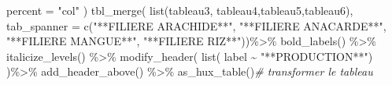 \documentclass[
  14pt,
]{article}
\newenvironment{Shaded}{\begin{snugshade}}{\end{snugshade}}
\newcommand{\AttributeTok}[1]{\textcolor[rgb]{0.77,0.63,0.00}{#1}}
\newcommand{\CommentTok}[1]{\textcolor[rgb]{0.56,0.35,0.01}{\textit{#1}}}
\newcommand{\FunctionTok}[1]{\textcolor[rgb]{0.00,0.00,0.00}{#1}}
\newcommand{\NormalTok}[1]{#1}
\newcommand{\SpecialCharTok}[1]{\textcolor[rgb]{0.00,0.00,0.00}{#1}}
\newcommand{\StringTok}[1]{\textcolor[rgb]{0.31,0.60,0.02}{#1}}
\begin{document}
\begin{Shaded}
\begin{Highlighting}[]
    \AttributeTok{percent =} \StringTok{"col"}
\NormalTok{  ) }
\FunctionTok{tbl\_merge}\NormalTok{(}
  \FunctionTok{list}\NormalTok{(tableau3, tableau4,tableau5,tableau6),}
  \AttributeTok{tab\_spanner =} \FunctionTok{c}\NormalTok{(}\StringTok{"**FILIERE ARACHIDE**"}\NormalTok{, }
                  \StringTok{"**FILIERE ANACARDE**"}\NormalTok{,}
                  \StringTok{"**FILIERE MANGUE**"}\NormalTok{,}
                  \StringTok{"**FILIERE RIZ**"}\NormalTok{))}\SpecialCharTok{\%\textgreater{}\%}
  \FunctionTok{bold\_labels}\NormalTok{() }\SpecialCharTok{\%\textgreater{}\%}
  \FunctionTok{italicize\_levels}\NormalTok{() }\SpecialCharTok{\%\textgreater{}\%}  
  \FunctionTok{modify\_header}\NormalTok{(}
    \FunctionTok{list}\NormalTok{(}
\NormalTok{      label }\SpecialCharTok{\textasciitilde{}} \StringTok{"**PRODUCTION**"}\NormalTok{)}
\NormalTok{  )}\SpecialCharTok{\%\textgreater{}\%}
  \FunctionTok{add\_header\_above}\NormalTok{() }\SpecialCharTok{\%\textgreater{}\%} 
  \FunctionTok{as\_hux\_table}\NormalTok{()}\CommentTok{\# transformer le tableau }
\end{Highlighting}
\end{Shaded}

 
  \providecommand{\huxb}[2]{\arrayrulecolor[RGB]{#1}\global\arrayrulewidth=#2pt}
  \providecommand{\huxvb}[2]{\color[RGB]{#1}\vrule width #2pt}
  \providecommand{\huxtpad}[1]{\rule{0pt}{#1}}
  \providecommand{\huxbpad}[1]{\rule[-#1]{0pt}{#1}}
\end{document}
